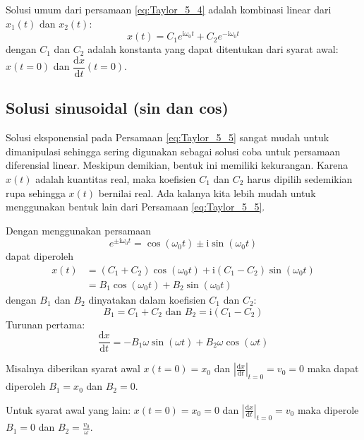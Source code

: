 Solusi umum dari persamaan \eqref{eq:Taylor_5_4} adalah kombinasi linear dari
$x_{1}(t)$ dan $x_{2}(t)$:
\begin{equation}
x(t) = C_{1} e^{\mathrm{i}\omega_{0} t} + C_{2} e^{-\mathrm{i}\omega_{0} t}
\label{eq:Taylor_5_5}
\end{equation}
dengan $C_1$ dan $C_2$ adalah konstanta yang dapat
ditentukan dari syarat awal: $x(t=0)$ dan $\dfrac{\mathrm{d}x}{\mathrm{d}t}(t=0)$.



\subsection*{Solusi sinusoidal (sin dan cos)}

Solusi eksponensial pada Persamaan \eqref{eq:Taylor_5_5} sangat mudah untuk dimanipulasi
sehingga sering digunakan sebagai solusi coba untuk persamaan diferensial linear. Meskipun
demikian, bentuk ini memiliki kekurangan. Karena $x(t)$ adalah kuantitas real, maka koefisien
$C_1$ dan $C_2$ harus dipilih sedemikian rupa sehingga $x(t)$ bernilai real. Ada kalanya
kita lebih mudah untuk menggunakan bentuk lain dari Persamaan \eqref{eq:Taylor_5_5}.

Dengan menggunakan persamaan
\begin{equation*}
e^{\pm\mathrm{i}\omega_{0} t} = \cos(\omega_{0} t)\pm\mathrm{i}\sin(\omega_{0} t)
\end{equation*}
%
dapat diperoleh
%
\begin{align*}
x(t) & = (C_{1} + C_{2}) \cos(\omega_{0} t) + \mathrm{i}(C_{1} - C_{2})\sin(\omega_{0} t) \nonumber \\
     & = B_{1}\cos(\omega_{0} t) + B_{2}\sin(\omega_{0} t) \label{eq:Taylor_5-6}
\end{align*}
%
dengan $B_1$ dan $B_2$ dinyatakan dalam koefisien $C_1$ dan $C_2$:
%
\begin{equation}
B_{1} = C_{1} + C_{2} \text{ dan } B_{2} = \mathrm{i}(C_{1} - C_{2})
\label{eq:Taylor_5_7}
\end{equation}
%
Turunan pertama:
\begin{equation*}
\frac{\mathrm{d}x}{\mathrm{d}t}=-B_{1}\omega\sin(\omega t)+B_{2}\omega\cos(\omega t)
\end{equation*}

Misalnya diberikan syarat awal
$x(t=0) = x_{0}$
dan
$\left|\frac{\mathrm{d}x}{\mathrm{d}t}\right|_{t=0} = v_{0} = 0$
maka dapat diperoleh $B_{1} = x_{0}$ dan $B_{2} = 0$.

Untuk syarat awal yang lain:
$x(t=0) = x_0 = 0$
dan
$\left|\frac{\mathrm{d}x}{\mathrm{d}t}\right|_{t=0} = v_{0}$
maka diperole $B_{1} = 0$ dan $B_{2} = \frac{v_{0}}{\omega}$.

